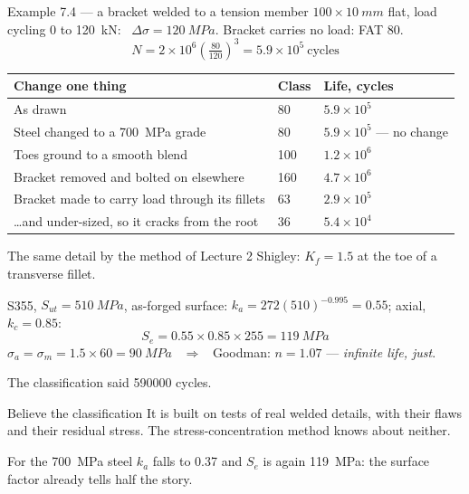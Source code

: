 \documentclass[aspectratio=169,10pt]{beamer}
\begin{document}
\begin{frame}{Example 7.4 --- a bracket welded to a tension member}
$100\times\SI{10}{mm}$ flat, load cycling 0 to \SI{120}{kN}: \ $\Delta\sigma=\SI{120}{MPa}$. Bracket carries no load: FAT 80.
\[ N=2\times10^{6}\left(\tfrac{80}{120}\right)^{3}=5.9\times10^{5}\ \text{cycles} \]
\centering\small
\begin{tabular}{@{}lll@{}}
\toprule
Change one thing & Class & Life, cycles\\
\midrule
As drawn & 80 & $5.9\times10^{5}$\\
Steel changed to a \SI{700}{MPa} grade & 80 & $5.9\times10^{5}$ --- \alert{no change}\\
Toes ground to a smooth blend & 100 & $1.2\times10^{6}$\\
Bracket removed and bolted on elsewhere & 160 & $4.7\times10^{6}$\\
Bracket made to carry load through its fillets & 63 & $2.9\times10^{5}$\\
\ldots and under-sized, so it cracks from the root & 36 & $5.4\times10^{4}$\\
\bottomrule
\end{tabular}
\end{frame}

\begin{frame}{The same detail by the method of Lecture 2}
Shigley: $K_f=1.5$ at the toe of a transverse fillet.

\medskip
S355, $S_{ut}=\SI{510}{MPa}$, as-forged surface: $k_a=272(510)^{-0.995}=0.55$; axial, $k_c=0.85$:
\[ S_e=0.55\times0.85\times255=\SI{119}{MPa} \]
$\sigma_a=\sigma_m=1.5\times60=\SI{90}{MPa}$ \ $\Rightarrow$ \ Goodman: $n=1.07$ --- \emph{infinite life, just}.

\vfill
The classification said \num{590000} cycles.

\begin{alertblock}{Believe the classification}
It is built on tests of real welded details, with their flaws and their residual stress. The
stress-concentration method knows about neither.
\end{alertblock}
{\footnotesize For the \SI{700}{MPa} steel $k_a$ falls to 0.37 and $S_e$ is again \SI{119}{MPa}: the surface factor already tells half the story.}
\end{frame}
\end{document}
